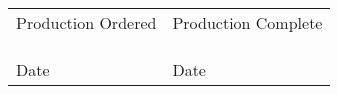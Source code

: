 \documentclass[fontsize = 9pt, BCOR=1.5cm, DIV=14, twoside, titlepage = false]{scrartcl}
\begin{document}
\begin{tabularx}{1.0\textwidth}{|>{\centering\arraybackslash}p{}|>{\centering\arraybackslash}p{}|}
\hline
  \small Production Ordered & \small Production Complete\\
  & \\
  & \\
  & \\
  \small Date & \small Date \\
\hline
\end{tabularx}
\end{document}
